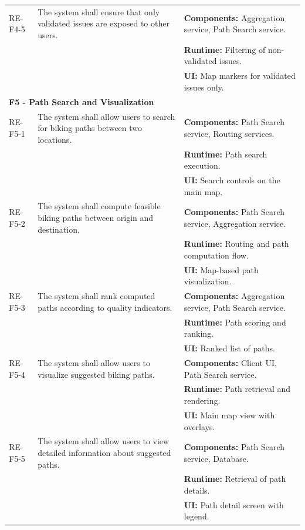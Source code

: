 \begin{longtable}{|p{2.4cm}|p{5.2cm}|p{7cm}|}
RE-F4-5 &
The system shall ensure that only validated issues are exposed to other users. &
\textbf{Components:} Aggregation service, Path Search service.\\
& & \textbf{Runtime:} Filtering of non-validated issues.\\
& & \textbf{UI:} Map markers for validated issues only.\\
\hline


\multicolumn{3}{|l|}{\textbf{F5 - Path Search and Visualization}}\\
\hline
RE-F5-1 &
The system shall allow users to search for biking paths between two locations. &
\textbf{Components:} Path Search service, Routing services.\\
& & \textbf{Runtime:} Path search execution.\\
& & \textbf{UI:} Search controls on the main map.\\
\hline

RE-F5-2 &
The system shall compute feasible biking paths between origin and destination. &
\textbf{Components:} Path Search service, Aggregation service.\\
& & \textbf{Runtime:} Routing and path computation flow.\\
& & \textbf{UI:} Map-based path visualization.\\
\hline

RE-F5-3 &
The system shall rank computed paths according to quality indicators. &
\textbf{Components:} Aggregation service, Path Search service.\\
& & \textbf{Runtime:} Path scoring and ranking.\\
& & \textbf{UI:} Ranked list of paths.\\
\hline

RE-F5-4 &
The system shall allow users to visualize suggested biking paths. &
\textbf{Components:} Client UI, Path Search service.\\
& & \textbf{Runtime:} Path retrieval and rendering.\\
& & \textbf{UI:} Main map view with overlays.\\
\hline

RE-F5-5 &
The system shall allow users to view detailed information about suggested paths. &
\textbf{Components:} Path Search service, Database.\\
& & \textbf{Runtime:} Retrieval of path details.\\
& & \textbf{UI:} Path detail screen with legend.\\
\hline

\end{longtable}
\normalsize
